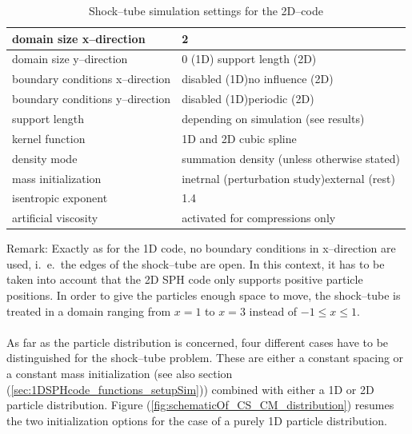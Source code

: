 \documentclass[11pt,a4paper,twoside]{report}
\begin{document}
\begin{table}[h] %
\label{tab:SimuSettings_Shock}
\centering

\begin{tabular}[c]{|l|p{5cm}|} %
\hline
\hline
domain size x--direction &  2\\
\hline
domain size y--direction &  0 (1D)\newline 1 support length (2D) \\
\hline
boundary conditions x--direction & disabled (1D)\newline no influence (2D)\\
\hline
boundary conditions y--direction & disabled (1D)\newline periodic (2D)\\
\hline
support length & depending on simulation \newline (see results)  \\
\hline
kernel function & 1D and 2D cubic spline \\
\hline
density mode & summation density \newline (unless otherwise stated) \\
\hline
mass initialization & inetrnal (perturbation study)\newline external (rest)\\
\hline
isentropic exponent & 1.4\\
\hline
artificial viscosity& activated for compressions only\\ 
\hline
\hline
\end{tabular}
\caption[]{Shock--tube simulation settings for the 2D--code}

\end{table}
Remark: Exactly as for the 1D code, no boundary conditions in x--direction are used, i.\ e.\ the edges of the shock--tube are open. In this context, it has to be taken into account that the 2D SPH code only supports positive particle positions. In order to give the particles enough space to move, the shock--tube is treated in a domain ranging from $x=1$ to $x=3$ instead of $-1\leq x\leq1$. \\
\\
\indent
As far as the particle distribution is concerned, four different cases have to be distinguished for the shock--tube problem. These are either a constant spacing or a constant mass initialization (see also section (\ref{sec:1DSPHcode_functions_setupSim})) combined with either a 1D or 2D particle distribution.
Figure (\ref{fig:schematicOf_CS_CM_distribution}) resumes the two initialization options for the case of a purely 1D particle distribution.
\end{document}
